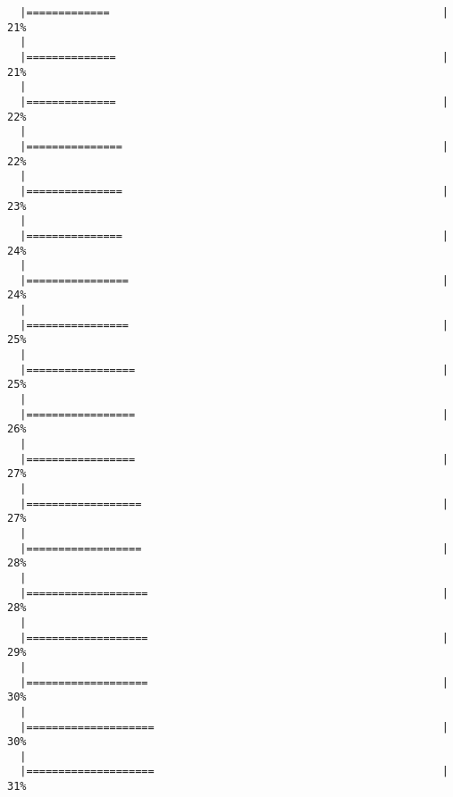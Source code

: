 \documentclass[]{article}
\begin{document}
\begin{verbatim}
  |=============                                                    |  21%
  |                                                                       
  |==============                                                   |  21%
  |                                                                       
  |==============                                                   |  22%
  |                                                                       
  |===============                                                  |  22%
  |                                                                       
  |===============                                                  |  23%
  |                                                                       
  |===============                                                  |  24%
  |                                                                       
  |================                                                 |  24%
  |                                                                       
  |================                                                 |  25%
  |                                                                       
  |=================                                                |  25%
  |                                                                       
  |=================                                                |  26%
  |                                                                       
  |=================                                                |  27%
  |                                                                       
  |==================                                               |  27%
  |                                                                       
  |==================                                               |  28%
  |                                                                       
  |===================                                              |  28%
  |                                                                       
  |===================                                              |  29%
  |                                                                       
  |===================                                              |  30%
  |                                                                       
  |====================                                             |  30%
  |                                                                       
  |====================                                             |  31%

\end{verbatim}
\end{document}
